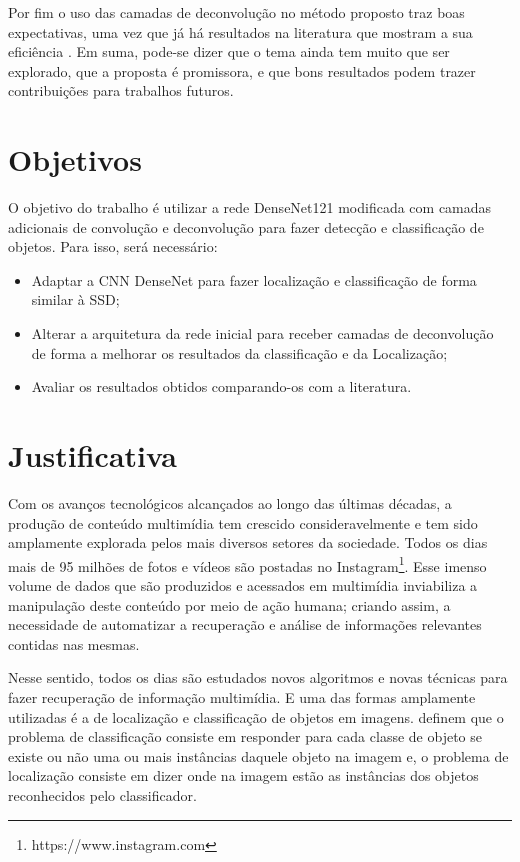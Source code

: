 Por fim o uso das camadas de deconvolução no método proposto traz boas expectativas, uma vez que já há resultados na literatura que mostram a sua eficiência \cite{noh:2015, cheng-2017}. Em suma, pode-se dizer que o tema ainda tem muito que ser explorado, que a proposta é promissora, e que bons resultados podem trazer contribuições para trabalhos futuros.

\section{Objetivos}
\label{secao:1:2}  

O objetivo do trabalho é utilizar a rede \ac{DenseNet}121 modificada com camadas adicionais de convolução e deconvolução para fazer detecção e classificação de objetos. Para isso, será necessário:

\begin{itemize}
	\item Adaptar a \ac{CNN} \ac{DenseNet} \cite{liu-2017} para fazer localização e classificação de forma similar à \ac{SSD};
	\item Alterar a arquitetura da rede inicial para receber camadas de deconvolução de forma a melhorar os resultados da classificação e da Localização;
	\item Avaliar os resultados obtidos comparando-os com a literatura.
\end{itemize}

\section{Justificativa}
\label{secao:1:3}

Com os avanços tecnológicos alcançados ao longo das últimas décadas, a produção de conteúdo multimídia tem crescido consideravelmente e tem sido amplamente explorada pelos mais diversos setores da sociedade. Todos os dias mais de 95 milhões de fotos e vídeos são postadas no Instagram\footnote{https://www.instagram.com}. Esse imenso volume de dados que são produzidos e acessados em multimídia inviabiliza a manipulação deste conteúdo por meio de ação humana; criando assim, a necessidade de automatizar a recuperação e análise de informações relevantes contidas nas mesmas.

Nesse sentido, todos os dias são estudados novos algoritmos e novas técnicas para fazer recuperação de informação multimídia. E uma das formas amplamente utilizadas é a de localização e classificação de objetos em imagens.  definem que o problema de classificação consiste em responder para cada classe de objeto se existe ou não uma ou mais instâncias daquele objeto na imagem e, o problema de localização consiste em dizer onde na imagem estão as instâncias dos objetos reconhecidos pelo classificador.

